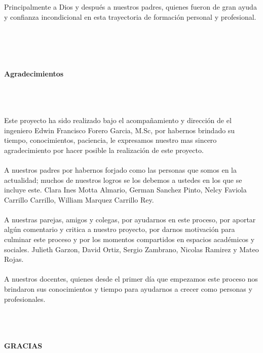 \begin{flushright}
\begin{minipage}{8cm}
    \noindent
        \small
		Principalmente a Dios y después a nuestros padres, quienes fueron de gran ayuda y confianza incondicional en esta trayectoria de formación personal y profesional.  \\[4.0cm]\\
        
\end{minipage}
\end{flushright}


\newpage{\clearpage}
\thispagestyle{empty} \textbf{}\normalsize
\\\\\\%
\textbf{\LARGE Agradecimientos}
\setcounter{page}{5}
\\\\\\
Este proyecto ha sido realizado bajo el acompañamiento y dirección de el ingeniero Edwin Francisco Forero Garcia, M.Sc, por habernos brindado su tiempo, conocimientos, paciencia, le expresamos nuestro mas sincero agradecimiento por hacer posible la realización de este proyecto.\\\\
A nuestros padres por habernos forjado como las personas que somos en la actualidad; muchos de nuestros logros se los debemos a ustedes en los que se incluye este. Clara Ines Motta Almario, German Sanchez Pinto, Nelcy Faviola Carrillo Carrillo, William Marquez Carrillo Rey.  \\\\
A nuestras parejas, amigos y colegas, por ayudarnos en este proceso, por aportar algún comentario y critica a nuestro proyecto, por darnos motivación para culminar este proceso y por los momentos compartidos en espacios académicos y sociales. Julieth Garzon, David Ortiz, Sergio Zambrano, Nicolas Ramirez y Mateo Rojas.  \\\\
A nuestros docentes, quienes desde el primer día que empezamos este proceso nos brindaron sus conocimientos y tiempo para ayudarnos a crecer como personas y profesionales.\\\\\\\\
\begin{flushright}
\textbf{\large{ GRACIAS}}
\end{flushright}



